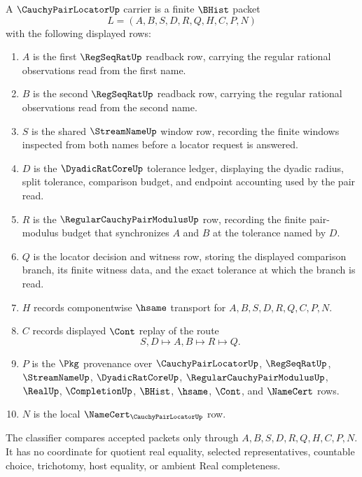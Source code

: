 \begin{definition}
\label{def:cauchy-pair-locator-carrier}
A $\CauchyPairLocatorUp$ carrier is a finite $\BHist$ packet
$$
L=(A,B,S,D,R,Q,H,C,P,N)
$$
with the following displayed rows:
\begin{enumerate}
\item $A$ is the first $\RegSeqRatUp$ readback row, carrying the regular rational observations read from the first name.
\item $B$ is the second $\RegSeqRatUp$ readback row, carrying the regular rational observations read from the second name.
\item $S$ is the shared $\StreamNameUp$ window row, recording the finite windows inspected from both names before a locator request is answered.
\item $D$ is the $\DyadicRatCoreUp$ tolerance ledger, displaying the dyadic radius, split tolerance, comparison budget, and endpoint accounting used by the pair read.
\item $R$ is the $\RegularCauchyPairModulusUp$ row, recording the finite pair-modulus budget that synchronizes $A$ and $B$ at the tolerance named by $D$.
\item $Q$ is the locator decision and witness row, storing the displayed comparison branch, its finite witness data, and the exact tolerance at which the branch is read.
\item $H$ records componentwise $\hsame$ transport for $A,B,S,D,R,Q,C,P,N$.
\item $C$ records displayed $\Cont$ replay of the route
$$
S,D \longmapsto A,B \longmapsto R \longmapsto Q .
$$
\item $P$ is the $\Pkg$ provenance over $\CauchyPairLocatorUp$, $\RegSeqRatUp$, $\StreamNameUp$, $\DyadicRatCoreUp$, $\RegularCauchyPairModulusUp$, $\RealUp$, $\CompletionUp$, $\BHist$, $\hsame$, $\Cont$, and $\NameCert$ rows.
\item $N$ is the local $\NameCert_{\CauchyPairLocatorUp}$ row.
\end{enumerate}
The classifier compares accepted packets only through $A,B,S,D,R,Q,H,C,P,N$. It has no coordinate for quotient real equality, selected representatives, countable choice, trichotomy, host equality, or ambient Real completeness.
\end{definition}

